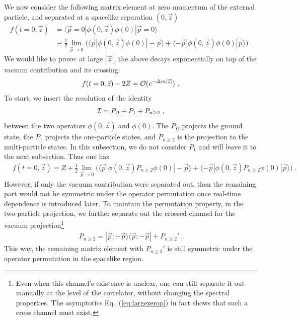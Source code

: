 \documentclass[a4paper,11pt]{article}
\begin{document}
We now consider the following matrix element at zero momentum of the external particle, and separated at a spacelike separation $(0,\vec{z})$
\begin{align}
f(t=0,\vec{z})&=\langle \vec{p}=0|\phi(0,\vec{z})\phi(0)|\vec{p}=0\rangle \nonumber \\ &\equiv \frac{1}{2}\lim_{\vec{p}\rightarrow0}\bigg(\langle \vec{p}|\phi(0,\vec{z})\phi(0)|-\vec{p}\rangle+\langle -\vec{p}|\phi(0,\vec{z})\phi(0)|\vec{p}\rangle\bigg)  \ . 
\end{align}
We would like to prove: at large $|\vec{z}|$, the above decays exponentially on top of the vacuum contribution and its crossing:
\begin{align}
f(t=0,\vec{z})-2Z={\cal O}(e^{-\Delta m|\vec{z}|}) \ . \label{eq:largezerop}
\end{align}
To start, we insert the resolution of the identity
\begin{align}
{\cal I}=P_{\Omega}+P_{1}+P_{n\ge 2} \ ,
\end{align}
between the two operators $\phi(0,\vec{z})$ and $\phi(0)$. The $P_{\Omega}$ projects the ground state, the $P_1$ projects the one-particle states, and $P_{n\ge 2}$ is the projection to the multi-particle states. In this subsection, we do not consider $P_1$ and will leave it to the next subsection. Thus one has
\begin{align}
&f(t=0,\vec{z}) = Z+\frac{1}{2}\lim_{\vec{p}\rightarrow0}\bigg(\langle \vec{p}|\phi(0,\vec{z})P_{n\ge 2}\phi(0)|-\vec{p}\rangle+\langle -\vec{p}|\phi(0,\vec{z})P_{n\ge 2}\phi(0)|\vec{p}\rangle\bigg) \ . 
\end{align}
However, if only the vacuum contribution were separated out, then the remaining part would not be symmetric under the operator permutation once real-time dependence is introduced later. To maintain the permutation property, in the two-particle projection, we further separate out the crossed channel for the vacuum projection\footnote{Even when this channel's existence is unclear, one can still separate it out manually at the level of the correlator, without changing the spectral properties. The asymptotics Eq.~(\ref{eq:largezerop}) in fact shows that such a cross channel must exist.}
\begin{align}\label{eq:Crossout}
P_{n\ge 2}=|\vec{p};-\vec{p}\rangle\langle \vec{p};-\vec{p}|+P_{n\ge 2}' \ .
\end{align}
This way, the remaining matrix element with $P_{n\ge 2}'$ is still symmetric under the operator permutation in the spacelike region. 
\end{document}
